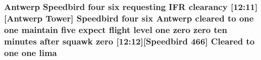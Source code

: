 \subsubsection[{\texorpdfstring{lima}{lima}}]{\setlength{\rightskip}{0pt plus 5cm}Antwerp Speedbird four {\bf six} requesting I\+FR clearancy \mbox{[}12\+:11\mbox{]}\mbox{[}Antwerp {\bf Tower}\mbox{]} Speedbird four {\bf six} Antwerp cleared to {\bf one} {\bf one} maintain five expect flight level {\bf one} {\bf zero} {\bf zero} {\bf ten} minutes after squawk {\bf zero} \mbox{[}12\+:12\mbox{]}\mbox{[}Speedbird 466\mbox{]} Cleared to {\bf one} {\bf one} lima}\hypertarget{happyDay4ATC_8txt_abc10fad7597c191bcd8586b1cddb7835}{}\label{happyDay4ATC_8txt_abc10fad7597c191bcd8586b1cddb7835}
